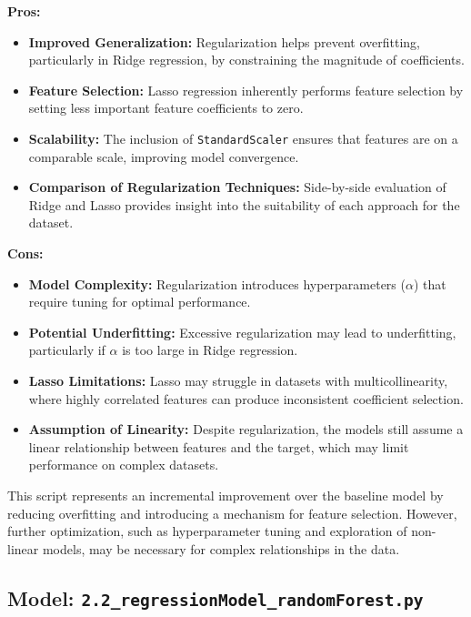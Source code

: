 \textbf{Pros:}
\begin{itemize}
    \item \textbf{Improved Generalization:} Regularization helps prevent overfitting, particularly in Ridge regression, by constraining the magnitude of coefficients.
    \item \textbf{Feature Selection:} Lasso regression inherently performs feature selection by setting less important feature coefficients to zero.
    \item \textbf{Scalability:} The inclusion of \texttt{StandardScaler} ensures that features are on a comparable scale, improving model convergence.
    \item \textbf{Comparison of Regularization Techniques:} Side-by-side evaluation of Ridge and Lasso provides insight into the suitability of each approach for the dataset.
\end{itemize}

\textbf{Cons:}
\begin{itemize}
    \item \textbf{Model Complexity:} Regularization introduces hyperparameters (\(\alpha\)) that require tuning for optimal performance.
    \item \textbf{Potential Underfitting:} Excessive regularization may lead to underfitting, particularly if \(\alpha\) is too large in Ridge regression.
    \item \textbf{Lasso Limitations:} Lasso may struggle in datasets with multicollinearity, where highly correlated features can produce inconsistent coefficient selection.
    \item \textbf{Assumption of Linearity:} Despite regularization, the models still assume a linear relationship between features and the target, which may limit performance on complex datasets.
\end{itemize}

This script represents an incremental improvement over the baseline model by reducing overfitting and introducing a mechanism for feature selection. However, further optimization, such as hyperparameter tuning and exploration of non-linear models, may be necessary for complex relationships in the data. \\

\hrulefill

\subsection{Model: \texttt{2.2\_regressionModel\_randomForest.py}}

